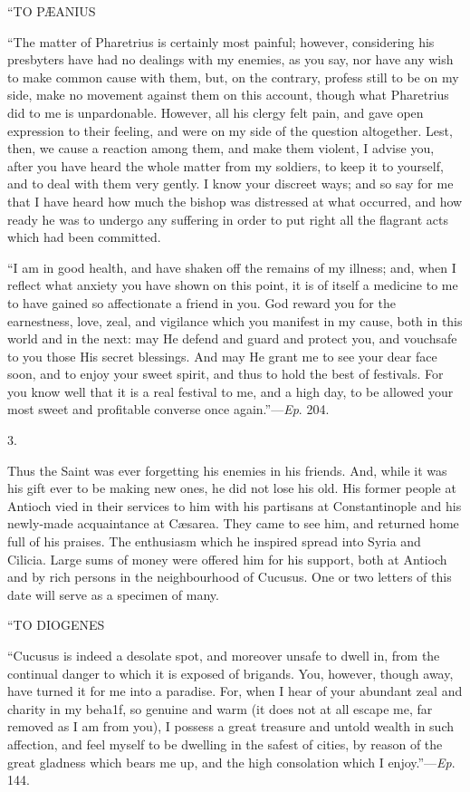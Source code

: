 ``TO
PÆANIUS

``The matter of Pharetrius is certainly most painful; however,
considering his presbyters have had no dealings with my enemies, as
you say, nor have any wish to make common cause with them, but, on the
contrary, profess still to be on my side, make no movement against
them on this account, though what Pharetrius did to me is
unpardonable. However, all his clergy felt pain, and gave open
expression to their feeling, and were on my side of the question
altogether. Lest, then, we cause a reaction among them, and make them
violent, I advise you, after you have heard the whole matter
from my soldiers, to keep it to yourself, and to deal with them very
gently. I know your discreet ways; and so say for me that I have heard
how much the bishop was distressed at what occurred, and how ready he
was to undergo any suffering in order to put right all the flagrant
acts which had been committed.

``I am in good health, and have shaken off the remains of my
illness; and, when I reflect what anxiety you have shown on this
point, it is of itself a medicine to me to have gained so affectionate
a friend in you. God reward you for the earnestness, love, zeal, and
vigilance which you manifest in my cause, both in this world and in
the next: may He defend and guard and protect you, and vouchsafe to
you those His secret blessings. And may He grant me to see your dear
face soon, and to enjoy your sweet spirit, and thus to hold the best
of festivals. For you know well that it is a real festival to me, and
a high day, to be allowed your most sweet and profitable converse once
again.''—\emph{Ep}. 204.

3.

Thus the Saint was ever forgetting his enemies in his friends. And,
while it was his gift ever to be making new ones, he did not lose his
old. His former people at Antioch vied in their services to him with
his partisans at Constantinople and his newly-made acquaintance at
Cæsarea. They came to see him, and returned home full of his praises.
The enthusiasm which he inspired spread into Syria and Cilicia. Large
sums of money were offered him for his support, both at Antioch and by
rich persons in the neighbourhood of Cucusus. One or two letters of
this date will serve as a specimen of many.

``TO
DIOGENES

``Cucusus is indeed a desolate spot, and moreover unsafe to
dwell in, from the continual danger to which it is exposed of
brigands. You, however, though away, have turned it for me into a
paradise. For, when I hear of your abundant zeal and charity in my
beha1f, so genuine and warm (it does not at all escape me,
far removed as I am from you), I possess a great
treasure and untold wealth in such affection, and feel myself to be
dwelling in the safest of cities, by reason of the great gladness
which bears me up, and the high consolation which I enjoy.''—\emph{Ep}.
144.


